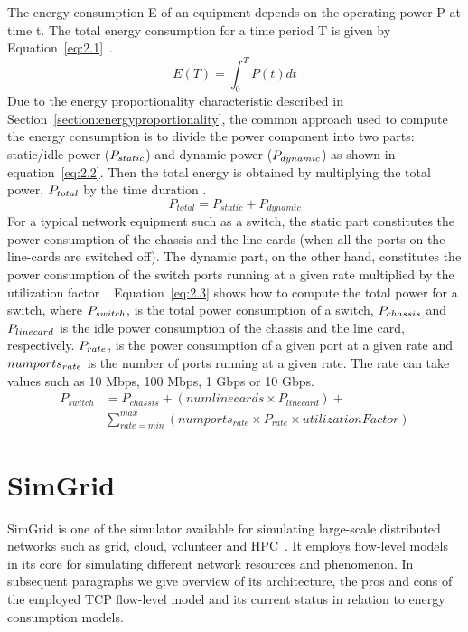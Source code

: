 The energy consumption E of an equipment depends on the operating power P at time t. The total energy consumption for a time period T is given by Equation~\ref{eq:2.1}~\cite{DBLP:conf/wowmom/OrgerieLLL11}. 
\begin{equation} \label{eq:2.1}
E(T) = \int_{0}^{T} P(t) dt
\end{equation} 
Due to the energy proportionality characteristic described in Section~\ref{section:energyproportionality}, the common approach used to compute the energy consumption is to divide the power component into two parts: static/idle power (\($$P_{static}$$\)) and dynamic power (\($$P_{dynamic}$$\)) as shown in equation~\ref{eq:2.2}. Then the total energy is obtained by multiplying the total power, \($$P_{total}$$\) by the time duration \cite{DBLP:conf/wowmom/OrgerieLLL11,DBLP:journals/tjs/KliazovichBK12,DBLP:conf/networking/MahadevanSBR09,DBLP:journals/comsur/DayarathnaWF16}. 
\begin{equation} \label{eq:2.2}
P_{total} = P_{static} + P_{dynamic}
\end{equation} 
For a typical network equipment such as a switch, the static part constitutes the power consumption of the chassis and the line-cards (when all the ports on the line-cards are switched off). The dynamic part, on the other hand, constitutes the power consumption of the switch ports running at a given rate multiplied by the utilization factor~\cite{DBLP:conf/networking/MahadevanSBR09}. Equation~\ref{eq:2.3} shows how to compute the total power for a switch, where \($$P_{switch}$$\), is the total power consumption of a switch, \($$P_{chassis}$$\) and \($$P_{linecard}$$\) is the idle power consumption of the chassis and the line card, respectively. \($$P_{rate}$$\), is the power consumption of a given port at a given rate and \($$numports_{rate}$$\) is the number of ports running at a given rate. The rate can take values such as 10 Mbps, 100 Mbps, 1 Gbps or 10 Gbps.
\begin{equation} \label{eq:2.3}
\begin{split}
P_{switch} &= P_{chassis} + (numlinecards \times P_{linecard})  + \\
&\sum_{rate=min}^{max} (numports_{rate} \times P_{rate} \times utilizationFactor)
\end{split}
\end{equation}
\section{SimGrid}
\label{section:simgrid} 
SimGrid is one of the simulator available for simulating large-scale distributed networks such as grid, cloud, volunteer and HPC~\cite{simgrid}. It employs flow-level models in its core for simulating different network resources and phenomenon. In subsequent paragraphs we give overview of its architecture, the pros and cons of the employed TCP flow-level model and its current status in relation to energy consumption models.

